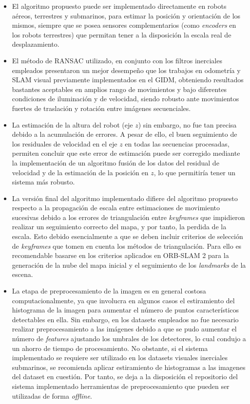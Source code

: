 \begin{itemize}
	\item El algoritmo propuesto puede ser implementado directamente en robots aéreos, terrestres y submarinos, para estimar la posición y orientación de los mismos, siempre que se posea sensores complementarios (como \textit{encoders} en los robots terrestres) que permitan tener a la disposición la escala real de desplazamiento.
	\item El método de RANSAC utilizado, en conjunto con los filtros inerciales empleados presentaron un mejor desempeño que los trabajos en odometría y SLAM visual previamente implementados en el GIDM, obteniendo resultados bastantes aceptables en amplios rango de movimientos y bajo diferentes condiciones de iluminación y de velocidad, siendo robusto ante movimientos fuertes de traslación y rotación entre imágenes secuenciales.
	\item La estimación de la altura del robot (eje $z$) sin embargo, no fue tan precisa debido a la acumulación de errores. A pesar de ello, el buen seguimiento de los residuales de velocidad en el eje $z$ en todas las secuencias procesadas, permiten concluir que este error de estimación puede ser corregido mediante la implementación de un algoritmo fusión de los datos del residual de velocidad y de la estimación de la posición en $z$, lo que permitiría tener un sistema más robusto. 
	\item La versión final del algoritmo implementado difiere del algoritmo propuesto respecto a la propagación de escala entre estimaciones de movimiento sucesivas debido a los errores de triangulación entre \textit{keyframes} que impidieron realizar un seguimiento correcto del mapa, y por tanto, la perdida de la escala. Esto debido esencialmente a que se deben incluir criterios de selección de \textit{keyframes} que tomen en cuenta los métodos de triangulación. Para ello es recomendable basarse en los criterios aplicados en ORB-SLAM 2 para la generación de la nube del mapa inicial y el seguimiento de los \textit{landmarks} de la escena.
	\item La etapa de preprocesamiento de la imagen es en general costosa computacionalmente, ya que involucra en algunos casos el estiramiento del histograma de la imagen para aumentar el número de puntos característicos detectables en ella. Sin embargo, en los datasets empleados no fue necesario realizar preprocesamiento a las imágenes debido a que se pudo aumentar el número de \textit{features} ajustando los umbrales de los detectores, lo cual condujo a un ahorro de tiempo de procesamiento. No obstante, si el sistema implementado se requiere ser utilizado en los datasets visuales inerciales submarinos, se recomienda aplicar estiramiento de histogramas a las imagenes del dataset en cuestión. Por tanto, se deja a la disposición el repositorio del sistema implementado herramientas de preprocesamiento que pueden ser utilizadas de forma \textit{offline}.

\end{itemize}
